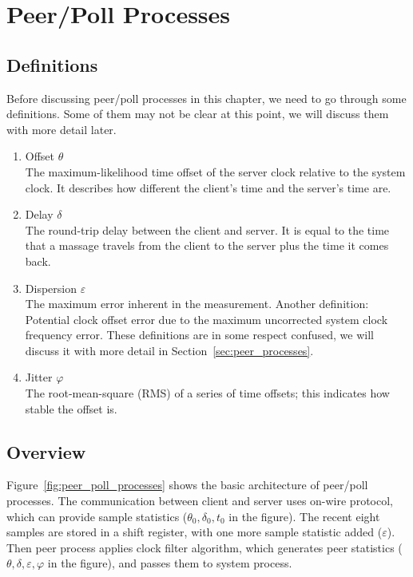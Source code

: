 \chapter{Peer/Poll Processes}
\label{cha:peer/poll_processes}

\section{Definitions}%
\label{sec:peer/poll_concepts}
Before discussing peer/poll processes in this chapter, we need to go through
some definitions. Some of them may not be clear at this point, we will discuss
them with more detail later.
\begin{enumerate}
    \item Offset $\theta$\\
        The maximum-likelihood time offset of the server clock relative to the
        system clock. It describes how different the client's time
        and the server's time are.
    \item Delay $\delta$\\
        The round-trip delay between the client and server. It is equal to the
        time that a massage travels from the client to the server plus the time
        it comes back.
    \item Dispersion $\varepsilon$\\
        The maximum error inherent in the measurement.
        Another definition: Potential clock offset error due to the maximum
        uncorrected system clock frequency error.
        These definitions are in some respect confused, we will discuss it with
        more detail in Section~\ref{sec:peer_processes}.
    \item Jitter $\varphi$\\
        The root-mean-square (RMS) of a series of time offsets; this indicates 
        how stable the offset is.
\end{enumerate}

\section{Overview}%
\label{sec:peer_poll_overview}
Figure~\ref{fig:peer_poll_processes} shows the basic architecture of peer/poll
processes. The communication between client and server uses on-wire protocol,
which can provide sample statistics ($\theta_0, \delta_0, t_0$ in the figure).
The recent eight samples are stored in a shift register, with one more sample
statistic added ($\varepsilon$). Then peer process applies clock filter
algorithm, which generates peer statistics ($\theta, \delta, \varepsilon,
\varphi$ in the figure), and passes them to system process.

